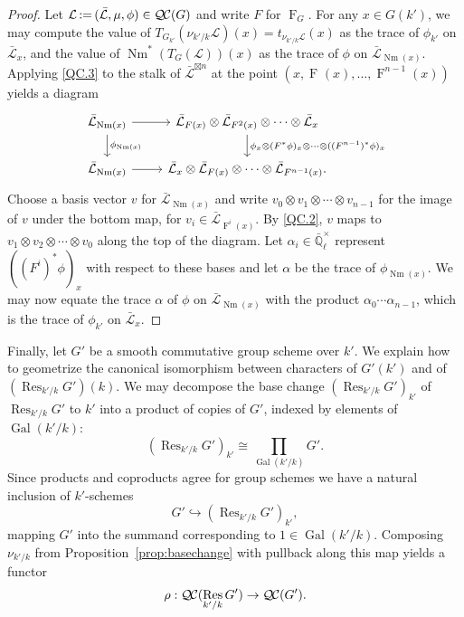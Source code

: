 \documentclass[10pt]{amsart}
\theoremstyle{plain}
\theoremstyle{definition}
\theoremstyle{remark}
\newcommand{\EE}{\mathbb{\bar Q}_\ell}
\newcommand{\EEx}{\EE^\times}
\DeclareMathOperator{\Gal}{Gal}
\newcommand{\Frob}[1]{\operatorname{F}_{#1}}
\DeclareMathOperator{\Res}{Res}
\DeclareMathOperator{\Nm}{Nm}
\newcommand{\ceq}{{\, :=\, }}
\newcommand{\TrFrob}[1]{T_{#1}}
\newcommand{\qcs}[1]{{\mathcal{#1}}}
\newcommand{\gqcs}[1]{{\mathcal{\bar #1}}}
\newcommand{\QC}{{\mathcal{Q\hskip-0.8pt C}}}
\begin{document}
\begin{proof}
Let $\qcs{L} \ceq (\gqcs{L}, \mu, \phi) \in \QC(G)$ and write $F$ for $\Frob{G}$.  For any $x \in G(k')$,
we may compute the value of $\TrFrob{G_{k'}}(\nu_{k'/k}\qcs{L})(x)= t_{\nu_{k'/k}\qcs{L}}(x)$ as the trace of $\phi_{k'}$ on $\gqcs{L}_x$,
and the value of $\Nm^*(\TrFrob{G}(\qcs{L}))(x)$ as the trace of $\phi$ on $\gqcs{L}_{\Nm(x)}$.
Applying \ref{QC.3} to the stalk of $\gqcs{L}^{\boxtimes n}$ at the point $(x, \Frob{}(x), \ldots, \Frob{}^{n-1}(x))$ yields a diagram
\[
\begin{tikzcd}
\gqcs{L}_{\Nm(x)} \rar \dar{\phi_{\Nm(x)}} & \gqcs{L}_{F(x)} \otimes \gqcs{L}_{F^2(x)} \otimes \cdots \otimes \gqcs{L}_x
\dar{\phi_x \otimes (F^*\phi)_x \otimes \cdots \otimes ((F^{n-1})^*\phi)_x} \\
\gqcs{L}_{\Nm(x)} \rar & \gqcs{L}_x \otimes \gqcs{L}_{F(x)} \otimes \cdots \otimes \gqcs{L}_{F^{n-1}(x)}.
\end{tikzcd}
\]
Choose a basis vector $v$ for $\gqcs{L}_{\Nm(x)}$ and write $v_0 \otimes v_1 \otimes \cdots \otimes v_{n-1}$ for the image of $v$ under the
bottom map,
for $v_i \in \gqcs{L}_{\Frob{}^i(x)}$.  By \ref{QC.2}, $v$ maps to
$v_1 \otimes v_2 \otimes \cdots \otimes v_0$ along the top of the diagram.
Let $\alpha_i \in \EEx$ represent $((F^i)^*\phi)_x$ with respect to these bases and let $\alpha$ be
the trace of $\phi_{\Nm(x)}$.  We may now equate the trace $\alpha$ of $\phi$ on $\gqcs{L}_{\Nm(x)}$
with the product $\alpha_0 \cdots \alpha_{n-1}$, which is the trace of $\phi_{k'}$ on $\gqcs{L}_x$.
\end{proof}

Finally, let $G'$ be a smooth commutative group scheme over $k'$.
We explain how to geometrize the canonical isomorphism between characters of $G'(k')$ and of $(\Res_{k'/k}G')(k)$.
We may decompose the base change $(\Res_{k'/k}G')_{k'}$ of $\Res_{k'/k}G'$ to $k'$
into a product of copies of $G'$, indexed by elements of $\Gal(k'/k)$:
\[
(\Res_{k'/k}G')_{k'} \cong \prod_{\Gal(k'/k)} G'.
\]
Since products and coproducts agree for group schemes we have a natural inclusion of $k'$-schemes
\[
G' \hookrightarrow (\Res_{k'/k}G')_{k'},
\]
mapping $G'$ into the summand corresponding to $1 \in \Gal(k'/k)$.  Composing $\nu_{k'/k}$
from Proposition~\ref{prop:basechange} with pullback along this map yields a functor
\[
\rho : \QC(\Res_{k'/k}G') \to \QC(G').
\]
\end{document}
